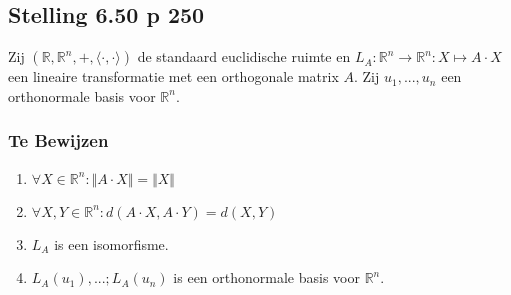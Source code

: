 \documentclass[lineaire_algebra_oplossingen.tex]{subfiles}
\begin{document}
\subsection{Stelling 6.50 p 250}
Zij $(\mathbb{R},\mathbb{R}^n,+,\langle \cdot , \cdot \rangle)$ de standaard euclidische ruimte   en $L_A : \mathbb{R}^n \rightarrow \mathbb{R}^n: X \mapsto A \cdot X$ een lineaire transformatie met een orthogonale matrix $A$. Zij $u_1,...,u_n$ een orthonormale basis voor $\mathbb{R}^n$.

\subsubsection*{Te Bewijzen}
\begin{enumerate}
\item $\forall X \in \mathbb{R}^n: \Vert A \cdot X \Vert = \Vert X \Vert$

\item $\forall X,Y \in \mathbb{R}^n: d(A\cdot X,A\cdot Y) = d(X,Y)$

\item $L_A$ is een isomorfisme.

\item $L_A(u_1),...;L_A(u_n)$ is een orthonormale basis voor $\mathbb{R}^n$.

\end{enumerate}
\end{document}
